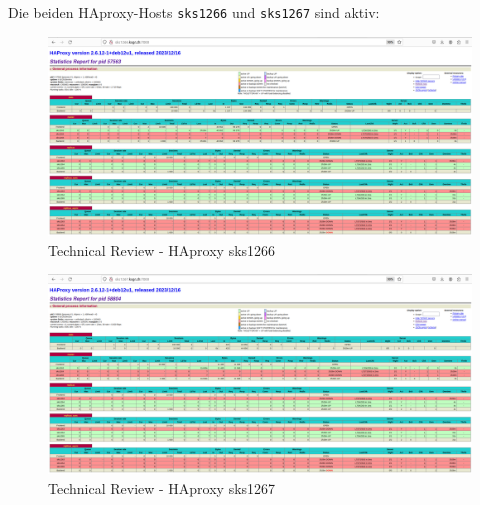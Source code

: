 \begin{flushleft}
    Die beiden HAproxy-Hosts \texttt{sks1266} und \texttt{sks1267} sind aktiv:
    \begin{figure}[H]
        \centering
        \includegraphics[width=1\linewidth]{source/implementation/construction_implementation/technical_review/haproxy_sks1266}
        \caption{Technical Review - HAproxy sks1266}
        \label{fig:haproxy_sks1266}
    \end{figure}
    \begin{figure}[H]
        \centering
        \includegraphics[width=1\linewidth]{source/implementation/construction_implementation/technical_review/haproxy_sks1267}
        \caption{Technical Review - HAproxy sks1267}
        \label{fig:haproxy_sks1267}
    \end{figure}
\end{flushleft}